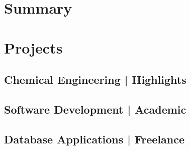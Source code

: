 %
\newcommand{\workitemsOne}[1]{%
  {\small
  \begin{itemize}[leftmargin=\lstindent]
    \item #1
  \end{itemize}
  }
}
%
\newcommand{\summary}[1]{%
  {\small
  \section{Summary}
  \noindent{#1}
  }
}
\newcommand{\statementSpace}{%
  \vspace{0.3em}%
  \\
}
%
%
%
%
%
\justifying
%
%
%
%
\summary{%

}
%
%
%
%
  \vspace{.5em}%
\section{Projects}%
  \vspace{-0.3em}%
%
\subsection{Chemical Engineering | Highlights}
%

%
\subsection{Software Development | Academic}
%

%
\subsection{Database Applications | Freelance}
%

%
%